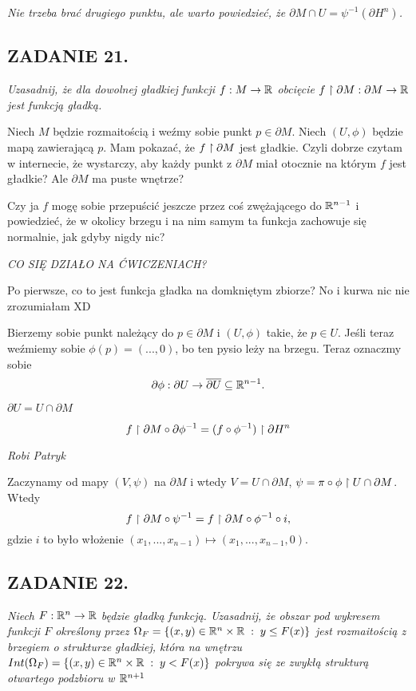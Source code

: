 \documentclass{article}
\begin{document}
\emph{Nie trzeba brać drugiego punktu, ale warto powiedzieć, że $\partial M\cap U=\psi^{-1}(\partial H^n)$.}

\subsection*{ZADANIE 21.}
\emph{\color{yellow}Uzasadnij, że dla dowolnej gładkiej funkcji $f:M\to\mathbb{R}$ obcięcie $f\upharpoonright \partial M:\partial M\to\mathbb{R}$ jest funkcją gładką.}
\smallskip

Niech $M$ będzie rozmaitością i weźmy sobie punkt $p\in\partial M$. Niech $(U, \phi)$ będzie mapą zawierającą $p$. Mam pokazać, że $f\upharpoonright \partial M$ jest gładkie. Czyli dobrze czytam w internecie, że wystarczy, aby każdy punkt z $\partial M$ miał otocznie na którym $f$ jest gładkie? Ale $\partial M$ ma puste wnętrze?

Czy ja $f$ mogę sobie przepuścić jeszcze przez coś zwężającego do $\mathbb{R}^{n-1}$ i powiedzieć, że w okolicy brzegu i na nim samym ta funkcja zachowuje się normalnie, jak gdyby nigdy nic?

\emph{CO SIĘ DZIAŁO NA ĆWICZENIACH?}

Po pierwsze, co to jest funkcja gładka na domkniętym zbiorze? No i kurwa nic nie
zrozumiałam XD

Bierzemy sobie punkt należący do $p\in\partial M$ i $(U,\phi)$ takie, że $p\in U$. Jeśli
teraz weźmiemy sobie $\phi(p)=(...,0)$, bo ten pysio leży na brzegu. Teraz oznaczmy sobie
$$\partial\phi:\partial U\to\overline{\partial U}\subseteq\mathbb{R}^{n-1}.$$

$\partial U=U\cap\partial M$

$$f\upharpoonright\partial M\circ\partial\phi^{-1}=(f\circ\phi^{-1})\upharpoonright\partial H^n$$

\emph{Robi Patryk}

Zaczynamy od mapy $(V,\psi)$  na $\partial M$ i wtedy $V=U\cap\partial M$,
$\psi=\pi\circ\phi\upharpoonright U\cap\partial M$. Wtedy 
$$f\upharpoonright\partial M\circ\psi^{-1}=f\upharpoonright\partial M\circ\phi^{-1}\circ i,$$
gdzie $i$ to było włożenie $(x_1,...,x_{n-1})\mapsto (x_1,...,x_{n-1},0)$.


\subsection*{ZADANIE 22.}
\emph{\color{yellow}Niech $F:\mathbb{R}^n\to\mathbb{R}$ będzie gładką funkcją. Uzasadnij, że obszar pod wykresem funkcji $F$ określony przez $\Omega_F=\{(x,y)\in\mathbb{R}^n\times\mathbb{R}\;:\;y\leq F(x)\}$ jest rozmaitością z brzegiem o strukturze gładkiej, która na wnętrzu $Int(\Omega_F)=\{(x,y)\in\mathbb{R}^n\times\mathbb{R}\;:\;y<F(x)\}$ pokrywa się ze zwykłą strukturą otwartego podzbioru w $\mathbb{R}^{n+1}$}
\smallskip
\end{document}
